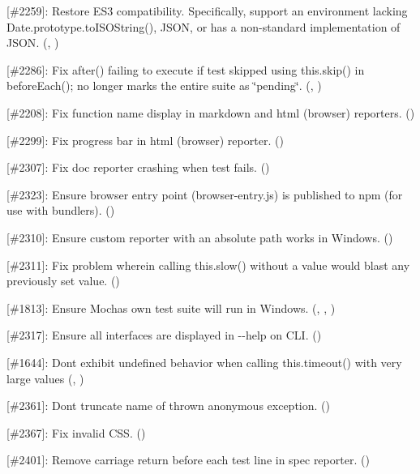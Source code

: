 \begin{DoxyItemize}
\item \mbox{[}\#2259\mbox{]}\+: Restore E\+S3 compatibility. Specifically, support an environment lacking {\ttfamily Date.\+prototype.\+to\+I\+S\+O\+String()}, {\ttfamily J\+S\+ON}, or has a non-\/standard implementation of {\ttfamily J\+S\+ON}. (\href{https://github.com/ndhoule}{\tt }, \href{https://github.com/boneskull}{\tt })
\item \mbox{[}\#2286\mbox{]}\+: Fix {\ttfamily after()} failing to execute if test skipped using {\ttfamily this.\+skip()} in {\ttfamily before\+Each()}; no longer marks the entire suite as \char`\"{}pending\char`\"{}. (\href{https://github.com/dasilvacontin}{\tt }, \href{https://github.com/boneskull}{\tt })
\item \mbox{[}\#2208\mbox{]}\+: Fix function name display in {\ttfamily markdown} and {\ttfamily html} (browser) reporters. (\href{https://github.com/ScottFreeCode}{\tt })
\item \mbox{[}\#2299\mbox{]}\+: Fix progress bar in {\ttfamily html} (browser) reporter. (\href{https://github.com/avivahl}{\tt })
\item \mbox{[}\#2307\mbox{]}\+: Fix {\ttfamily doc} reporter crashing when test fails. (\href{https://github.com/jleyba}{\tt })
\item \mbox{[}\#2323\mbox{]}\+: Ensure browser entry point ({\ttfamily browser-\/entry.\+js}) is published to npm (for use with bundlers). (\href{https://github.com/boneskull}{\tt })
\item \mbox{[}\#2310\mbox{]}\+: Ensure custom reporter with an absolute path works in Windows. (\href{https://github.com/silentcloud}{\tt })
\item \mbox{[}\#2311\mbox{]}\+: Fix problem wherein calling {\ttfamily this.\+slow()} without a value would blast any previously set value. (\href{https://github.com/boneskull}{\tt })
\item \mbox{[}\#1813\mbox{]}\+: Ensure Mocha\textquotesingle{}s own test suite will run in Windows. (\href{https://github.com/tswaters}{\tt }, \href{https://github.com/timothygu}{\tt }, \href{https://github.com/boneskull}{\tt })
\item \mbox{[}\#2317\mbox{]}\+: Ensure all interfaces are displayed in {\ttfamily -\/-\/help} on C\+LI. (\href{https://github.com/ScottFreeCode}{\tt })
\item \mbox{[}\#1644\mbox{]}\+: Don\textquotesingle{}t exhibit undefined behavior when calling {\ttfamily this.\+timeout()} with very large values (\href{https://github.com/callumacrae}{\tt }, \href{https://github.com/boneskull}{\tt })
\item \mbox{[}\#2361\mbox{]}\+: Don\textquotesingle{}t truncate name of thrown anonymous exception. (\href{https://github.com/boneskull}{\tt })
\item \mbox{[}\#2367\mbox{]}\+: Fix invalid C\+SS. (\href{https://github.com/bensontrent}{\tt })
\item \mbox{[}\#2401\mbox{]}\+: Remove carriage return before each test line in spec reporter. (\href{https://github.com/munter}{\tt })
\end{DoxyItemize}

